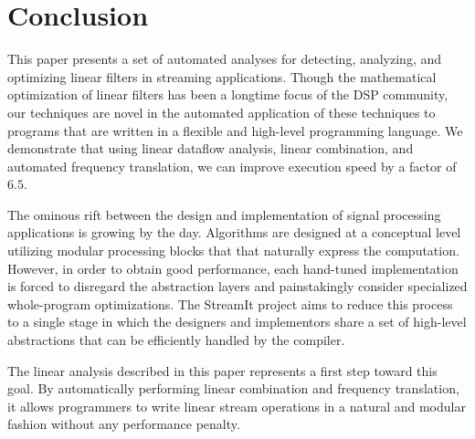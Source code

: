 \section{Conclusion}
\label{sec:conclusion}

This paper presents a set of automated analyses for detecting,
analyzing, and optimizing linear filters in streaming applications.
Though the mathematical optimization of linear filters has been a
longtime focus of the DSP community, our techniques are novel in the
automated application of these techniques to programs that are written
in a flexible and high-level programming language.  We demonstrate
that using linear dataflow analysis, linear combination, and automated
frequency translation, we can improve execution speed by a factor of $6.5$.

The ominous rift between the design and implementation of signal 
processing applications is growing by the day.  Algorithms are
designed at a conceptual level utilizing modular processing blocks that
that naturally express the computation.  However, in order to obtain
good performance, each hand-tuned implementation is forced to
disregard the abstraction layers and painstakingly consider
specialized whole-program optimizations. The StreamIt project aims to
reduce this process to a single stage in which the designers and
implementors share a set of high-level abstractions that can be
efficiently handled by the compiler.  

The linear analysis described in this paper represents a first step
toward this goal.  By automatically performing linear combination and
frequency translation, it allows programmers to write linear stream
operations in a natural and modular fashion without any performance
penalty.


